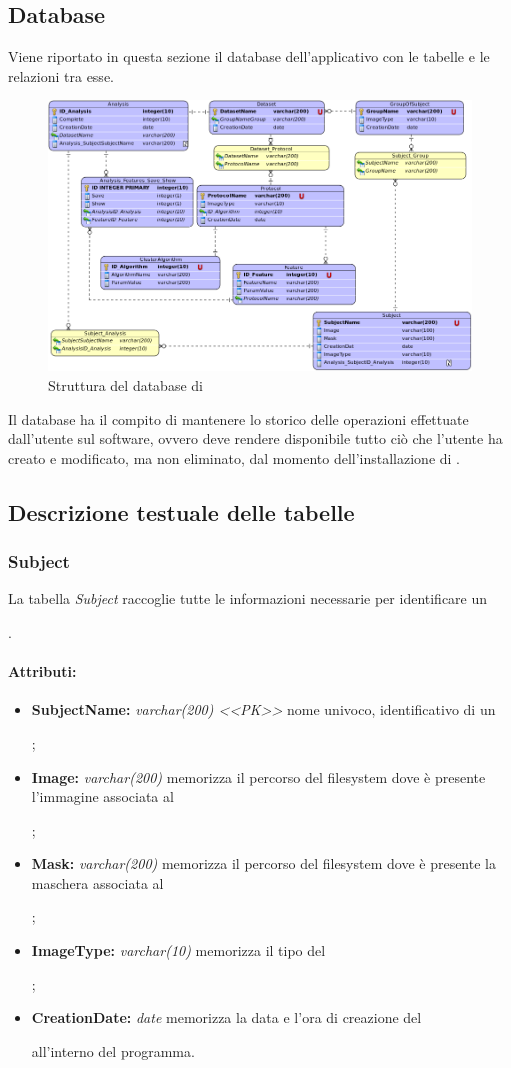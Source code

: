\begin{landscape}
\section{Database \project{}}
\label{DB}
Viene riportato in questa sezione il database dell'applicativo \project{} con le tabelle e le relazioni tra esse.
\begin{figure}[!h]
	\centering
	\includegraphics[width=0.7\linewidth]{./Content/Immagini/DatabaseRomeo.png}
	\caption{Struttura del database di \project{}}
	\label{DBRomeo}
\end{figure}
\end{landscape}
Il database ha il compito di mantenere lo storico delle operazioni effettuate dall'utente sul software, ovvero deve rendere disponibile tutto ciò che l'utente ha creato e modificato, ma non eliminato, dal momento dell'installazione di \project{}.

\subsection{Descrizione testuale delle tabelle}
\subsubsection{Subject}
\label{DBSub}
La tabella \textit{Subject} raccoglie tutte le informazioni necessarie per identificare un \subject{}.
\paragraph{Attributi:}
\begin{itemize}
\item \textbf{SubjectName:} \emph{varchar(200) <<PK>>} nome univoco, identificativo di un \subject{};
\item \textbf{Image:} \emph{varchar(200)} memorizza il percorso del filesystem dove è presente l'immagine associata al \subject{};
\item \textbf{Mask:} \emph{varchar(200)} memorizza il percorso del filesystem dove è presente la maschera associata al \subject{};
\item \textbf{ImageType:} \emph{varchar(10)} memorizza il tipo del \subject{};
\item \textbf{CreationDate:} \emph{date} memorizza la data e l'ora di creazione del \subject{} all'interno del programma.
\end{itemize}

